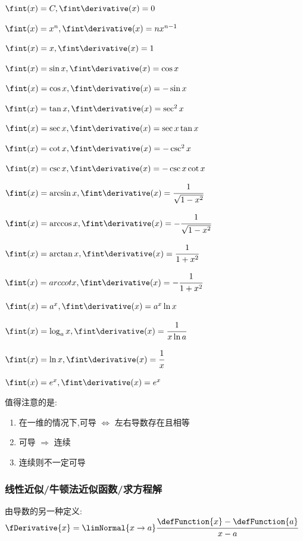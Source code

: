 {{{    $\fint(x) = C, \fint\derivative(x) = 0$

    $\fint(x) = x^n, \fint\derivative(x) = nx^{n-1}$

    $\fint(x) = x, \fint\derivative(x) = 1$

    $\fint(x) = \sin x, \fint\derivative(x) = \cos x$

    $\fint(x) = \cos x, \fint\derivative(x) = -\sin x$

    $\fint(x) = \tan x, \fint\derivative(x) = \sec^2 x$

    $\fint(x) = \sec x, \fint\derivative(x) = \sec x\tan x$

    $\fint(x) = \cot x, \fint\derivative(x) = -\csc^2 x$

    $\fint(x) = \csc x, \fint\derivative(x) = -\csc x\cot x$

    $\fint(x) = \arcsin x, \fint\derivative(x) = \cfrac{1}{\sqrt{1 - x^2}}$

    $\fint(x) = \arccos x, \fint\derivative(x) = -\cfrac{1}{\sqrt{1 - x^2}}$

    $\fint(x) = \arctan x, \fint\derivative(x) = \cfrac{1}{1 + x^2}$

    $\fint(x) = arccotx, \fint\derivative(x) = -\cfrac{1}{1 + x^2}$

    $\fint(x) = a^x, \fint\derivative(x) = a^x\ln x$

    $\fint(x) = \log_a x, \fint\derivative(x) = \cfrac{1}{x\ln a}$

    $\fint(x) = \ln x, \fint\derivative(x)= \cfrac{1}{x}$

    $\fint(x) = e^x, \fint\derivative(x) = e^x$
  }%
  \newline

  值得注意的是:
  \begin{enumerate}
    \item 在一维的情况下,可导 $\Leftrightarrow$ 左右导数存在且相等

    \item 可导 $\Rightarrow$ 连续

    \item 连续则不一定可导
  \end{enumerate}

  \subsubsection{线性近似/牛顿法近似函数/求方程解}{
    由导数的另一种定义:$\fDerivative{x} = \limNormal{x \to a}\cfrac{\defFunction{x} - \defFunction{a}}{x - a}$

}}}
